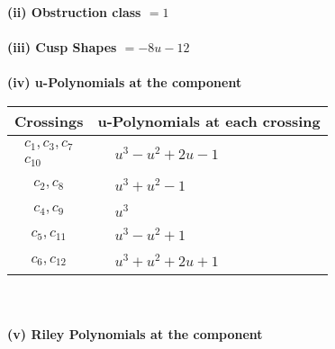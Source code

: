 \documentclass[1p]{elsarticle_modified}
\theoremstyle{definition}
\begin{document}
\flushleft \textbf{(ii) Obstruction class $= 1$}\\~\\
\flushleft \textbf{(iii) Cusp Shapes $= -8 u-12$}\\~\\
\newpage\renewcommand{\arraystretch}{1}
\flushleft \textbf{(iv) u-Polynomials at the component}\newline \\
\begin{tabular}{m{50pt}|m{274pt}}
Crossings & \hspace{64pt}u-Polynomials at each crossing \\
\hline $$\begin{aligned}c_{1},c_{3},c_{7}\\c_{10}\end{aligned}$$&$\begin{aligned}
&u^3- u^2+2 u-1
\end{aligned}$\\
\hline $$\begin{aligned}c_{2},c_{8}\end{aligned}$$&$\begin{aligned}
&u^3+u^2-1
\end{aligned}$\\
\hline $$\begin{aligned}c_{4},c_{9}\end{aligned}$$&$\begin{aligned}
&u^3
\end{aligned}$\\
\hline $$\begin{aligned}c_{5},c_{11}\end{aligned}$$&$\begin{aligned}
&u^3- u^2+1
\end{aligned}$\\
\hline $$\begin{aligned}c_{6},c_{12}\end{aligned}$$&$\begin{aligned}
&u^3+u^2+2 u+1
\end{aligned}$\\
\hline
\end{tabular}\\~\\
\newpage\renewcommand{\arraystretch}{1}
\flushleft \textbf{(v) Riley Polynomials at the component}\newline \\
\end{document}
